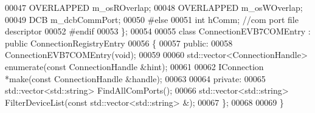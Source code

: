 \begin{DoxyCode}
00047         OVERLAPPED m_osROverlap;
00048         OVERLAPPED m_osWOverlap;
00049         DCB m_dcbCommPort;
00050 \textcolor{preprocessor}{    #else}
00051         \textcolor{keywordtype}{int} hComm; \textcolor{comment}{//com port file descriptor}
00052 \textcolor{preprocessor}{    #endif}
00053 \};
00054 
00055 \textcolor{keyword}{class }ConnectionEVB7COMEntry : \textcolor{keyword}{public} ConnectionRegistryEntry
00056 \{
00057 \textcolor{keyword}{public}:
00058     ConnectionEVB7COMEntry(\textcolor{keywordtype}{void});
00059 
00060     std::vector<ConnectionHandle> enumerate(\textcolor{keyword}{const} ConnectionHandle &hint);
00061 
00062     IConnection *make(\textcolor{keyword}{const} ConnectionHandle &handle);
00063 
00064 \textcolor{keyword}{private}:
00065     std::vector<std::string> FindAllComPorts();
00066     std::vector<std::string> FilterDeviceList(\textcolor{keyword}{const} std::vector<std::string> &);
00067 \};
00068 
00069 \}
\end{DoxyCode}

